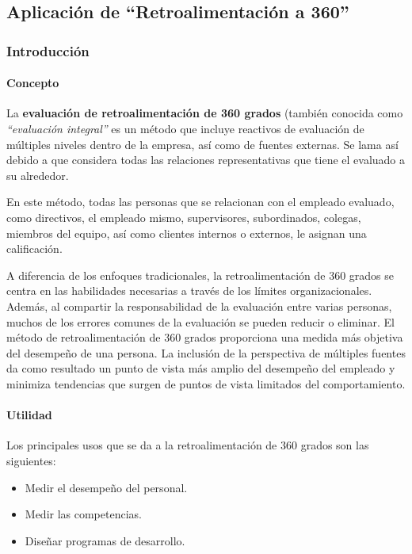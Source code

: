   

  
\newpage

\subsection{Aplicación de ``Retroalimentación a 360''} %

\subsubsection{Introducción}


\paragraph{Concepto}

La \textbf{evaluación de retroalimentación de 360 grados} (también conocida como \textit{``evaluación integral''} es un método que incluye reactivos de evaluación de múltiples niveles dentro de la empresa, así como de fuentes externas.
Se lama así debido a que considera todas las relaciones representativas que tiene el evaluado a su alrededor.

En este método, todas las personas que se relacionan con el empleado evaluado, como directivos, el empleado mismo, supervisores, subordinados, colegas, miembros del equipo, así como clientes internos o externos, le asignan una calificación.

A diferencia de los enfoques tradicionales, la retroalimentación de 360 grados se centra en las habilidades necesarias a través de los límites organizacionales.
Además, al compartir la responsabilidad de la evaluación entre varias personas, muchos de los errores comunes de la evaluación se pueden reducir o eliminar.
El método de retroalimentación de 360 grados proporciona una medida más objetiva del desempeño de una persona.
La inclusión de la perspectiva de múltiples fuentes da como resultado un punto de vista más amplio del desempeño del empleado y minimiza tendencias que surgen de puntos de vista limitados del comportamiento.


\paragraph{Utilidad}

Los principales usos que se da a la retroalimentación de 360 grados son las siguientes:

\begin{itemize}
    \item Medir el desempeño del personal.
    \item Medir las competencias.
    \item Diseñar programas de desarrollo.
\end{itemize}

